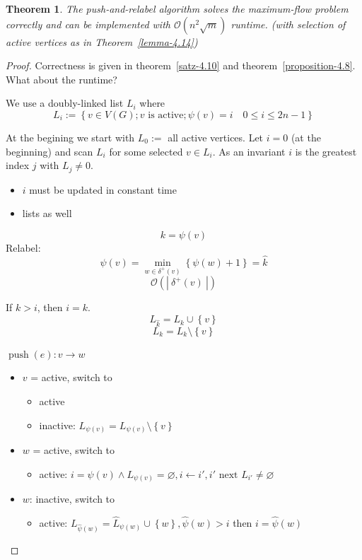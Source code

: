 \documentclass{article}
\newtheorem{theorem}{Theorem}
\newcommand{\card}[1]{\left|\:\!#1\:\!\right|}
\newcommand{\set}[1]{\left\{#1\right\}}
\DeclareMathOperator{\push}{push}
\begin{document}
\begin{theorem}\label{satz-4.15}
  The push-and-relabel algorithm solves the maximum-flow problem correctly and can be implemented with $\mathcal{O}(n^2 \sqrt{m})$ runtime.
  (with selection of active vertices as in Theorem~\ref{lemma-4.14})
\end{theorem}

\begin{proof}
  Correctness is given in theorem~\ref{satz-4.10} and theorem~\ref{proposition-4.8}. What about the runtime?

  We use a doubly-linked list $L_i$ where 
  \[
    L_i := \set{v \in V(G); v \text{ is active}; \psi(v) = i \quad 0 \leq i \leq 2n - 1}
  \]

  At the begining we start with $L_0 := $ all active vertices.
  Let $i = 0$ (at the beginning) and scan $L_i$ for some selected $v \in L_i$.
  As an invariant $i$ is the greatest index $j$ with $L_j \neq 0$.

  \begin{itemize}
    \item $i$ must be updated in constant time
    \item lists as well
  \end{itemize}

  \[ k = \psi(v) \]
  Relabel: \[ \psi(v) = \min_{w\in\delta^+(v)}{\set{\psi(w) + 1}} = \hat k \]
  \[ \mathcal{O}(\card{\delta^+(v)}) \]

  If $k > i$, then $i = k$.
  \[ L_{\hat k} = L_k \cup \set{v} \]
  \[ L_k = L_k \setminus \set{v} \]

  $\push(e): v \rightarrow w$
  \begin{itemize}
    \item $v$ = active, switch to
      \begin{itemize}
        \item active
        \item inactive: $L_{\psi(v)} = L_{\psi(v)} \setminus \set{v}$
      \end{itemize}
    \item $w$ = active, switch to
      \begin{itemize}
        \item active: $i = \psi(v) \land L_{\psi(v)} = \diameter, i \leftarrow i', i' \text{ next } L_{i'} \neq \diameter$
      \end{itemize}
    \item $w$: inactive, switch to
      \begin{itemize}
        \item active: $L_{\hat \psi(w)} = \hat L_{\psi(w)} \cup \set{w}, \hat\psi(w) > i$ then $i = \hat\psi(w)$
      \end{itemize}
  \end{itemize}


\end{proof}
\end{document}
